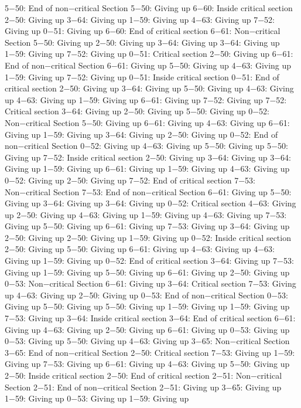 5−50: End of non−critical Section
5−50: Giving up
6−60: Inside critical section
2−50: Giving up
3−64: Giving up
1−59: Giving up
4−63: Giving up
7−52: Giving up
0−51: Giving up
6−60: End of critical section
6−61: Non−critical Section
5−50: Giving up
2−50: Giving up
3−64: Giving up
3−64: Giving up
1−59: Giving up
7−52: Giving up
0−51: Critical section
2−50: Giving up
6−61: End of non−critical Section
6−61: Giving up
5−50: Giving up
4−63: Giving up
1−59: Giving up
7−52: Giving up
0−51: Inside critical section
0−51: End of critical section
2−50: Giving up
3−64: Giving up
5−50: Giving up
4−63: Giving up
4−63: Giving up
1−59: Giving up
6−61: Giving up
7−52: Giving up
7−52: Critical section
3−64: Giving up
2−50: Giving up
5−50: Giving up
0−52: Non−critical Section
5−50: Giving up
6−61: Giving up
4−63: Giving up
6−61: Giving up
1−59: Giving up
3−64: Giving up
2−50: Giving up
0−52: End of non−critical Section
0−52: Giving up
4−63: Giving up
5−50: Giving up
5−50: Giving up
7−52: Inside critical section
2−50: Giving up
3−64: Giving up
3−64: Giving up
1−59: Giving up
6−61: Giving up
1−59: Giving up
4−63: Giving up
0−52: Giving up
2−50: Giving up
7−52: End of critical section
7−53: Non−critical Section
7−53: End of non−critical Section
6−61: Giving up
5−50: Giving up
3−64: Giving up
3−64: Giving up
0−52: Critical section
4−63: Giving up
2−50: Giving up
4−63: Giving up
1−59: Giving up
4−63: Giving up
7−53: Giving up
5−50: Giving up
6−61: Giving up
7−53: Giving up
3−64: Giving up
2−50: Giving up
2−50: Giving up
1−59: Giving up
0−52: Inside critical section
2−50: Giving up
5−50: Giving up
6−61: Giving up
4−63: Giving up
4−63: Giving up
1−59: Giving up
0−52: End of critical section
3−64: Giving up
7−53: Giving up
1−59: Giving up
5−50: Giving up
6−61: Giving up
2−50: Giving up
0−53: Non−critical Section
6−61: Giving up
3−64: Critical section
7−53: Giving up
4−63: Giving up
2−50: Giving up
0−53: End of non−critical Section
0−53: Giving up
5−50: Giving up
5−50: Giving up
1−59: Giving up
1−59: Giving up
7−53: Giving up
3−64: Inside critical section
3−64: End of critical section
6−61: Giving up
4−63: Giving up
2−50: Giving up
6−61: Giving up
0−53: Giving up
0−53: Giving up
5−50: Giving up
4−63: Giving up
3−65: Non−critical Section
3−65: End of non−critical Section
2−50: Critical section
7−53: Giving up
1−59: Giving up
7−53: Giving up
6−61: Giving up
4−63: Giving up
5−50: Giving up
2−50: Inside critical section
2−50: End of critical section
2−51: Non−critical Section
2−51: End of non−critical Section
2−51: Giving up
3−65: Giving up
1−59: Giving up
0−53: Giving up
1−59: Giving up
